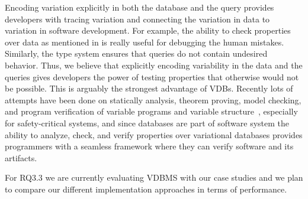  
%
%
Encoding variation explicitly in both the database and the query
provides developers with tracing variation and connecting
the variation in data to variation in software development.
For example,
the ability to check properties over data as mentioned in
 is really useful for debugging the
human mistakes. Similarly, the type system ensures that 
queries do not contain undesired behavior. 
%
Thus, we believe that explicitly
encoding variability in the data and the queries gives developers the 
power of testing properties that otherwise would not be possible. 
This is arguably the strongest advantage of VDBs. Recently
lots of attempts have been done
on statically analysis, theorem proving, model checking, and program verification
of variable programs and 
variable structure~\cite{brkts20vamos, bks11fvoos, ldl07jss, tmbhvs14}, especially 
for safety-critical systems,
 and since databases are part of 
software system the ability to analyze, check, and verify 
properties over variational databases provides programmers
with a seamless framework where they can verify software
and its artifacts.
%



For RQ3.3 we are currently evaluating VDBMS with our case studies and we plan
to compare our different implementation approaches in terms of performance.
 
 
%
%
%
%
